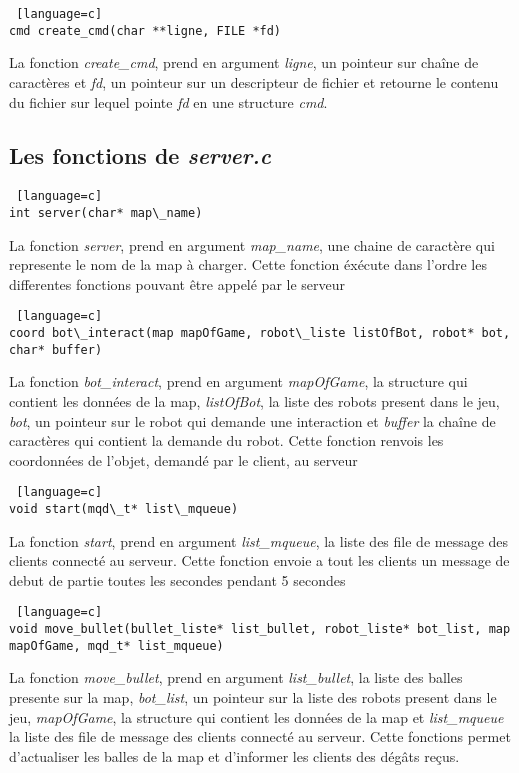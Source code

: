 \documentclass[a4paper, 11pt]{article}
\begin{document}
\begin {lstlisting} [language=c]
cmd create_cmd(char **ligne, FILE *fd)
\end{lstlisting}
La fonction \emph{create\_cmd}, prend en argument \emph{ligne}, un pointeur sur chaîne de caractères et \emph{fd}, un pointeur sur un descripteur de fichier et retourne le contenu du fichier sur lequel pointe \emph{fd} en une structure \emph{cmd}.\\

\newpage
\subsection{Les fonctions de \emph{server.c}}
\begin {lstlisting} [language=c]
int server(char* map\_name)
\end{lstlisting}
La fonction \emph{server}, prend en argument \emph{map\_name}, une chaine de caractère qui represente le nom de la map à charger. Cette
fonction éxécute dans l'ordre les differentes fonctions pouvant être appelé par le serveur\\

\begin {lstlisting} [language=c]
coord bot\_interact(map mapOfGame, robot\_liste listOfBot, robot* bot, char* buffer)
\end{lstlisting}
La fonction \emph{bot\_interact}, prend en argument \emph{mapOfGame}, la structure qui contient les données de la map, \emph{listOfBot}, la liste des robots present dans le jeu, \emph{bot}, un pointeur sur le robot qui demande une interaction et \emph{buffer} la chaîne de caractères qui contient la demande du robot. Cette fonction renvois les coordonnées de l'objet, demandé par le client, au serveur\\

\begin {lstlisting} [language=c]
void start(mqd\_t* list\_mqueue)
\end{lstlisting}
La fonction \emph{start}, prend en argument \emph{list\_mqueue}, la liste des file de message des clients connecté au serveur. Cette fonction envoie a tout les clients un message de debut de partie toutes les secondes pendant 5 secondes\\

\begin {lstlisting} [language=c]
void move_bullet(bullet_liste* list_bullet, robot_liste* bot_list, map mapOfGame, mqd_t* list_mqueue)
\end{lstlisting}
La fonction \emph{move\_bullet}, prend en argument \emph{list\_bullet}, la liste des balles presente sur la map, \emph{bot\_list}, un pointeur sur la liste des robots present dans le jeu, \emph{mapOfGame}, la structure qui contient les données de la map et \emph{list\_mqueue} la liste des file de message des clients connecté au serveur. Cette fonctions permet d'actualiser les balles de la map et d'informer les clients des dégâts reçus.\\
\end{document}
